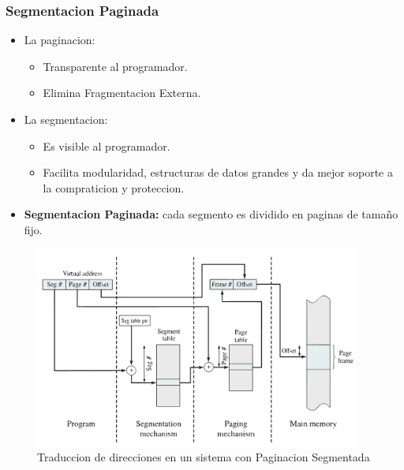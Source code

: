 \subsubsection{Segmentacion Paginada}
\begin{itemize}
    \item La paginacion:
    \begin{itemize}
        \item Transparente al programador.
        \item Elimina Fragmentacion Externa.
    \end{itemize}
    \item La segmentacion:
    \begin{itemize}
        \item Es visible al programador.
        \item Facilita modularidad, estructuras de datos grandes y da mejor soporte a la compraticion y proteccion.
    \end{itemize}
    \item \textbf{Segmentacion Paginada:} cada segmento es dividido en paginas de tamaño fijo.
\end{itemize}
\begin{figure}[h]
    \begin{center}
        \includegraphics[width=0.95\textwidth]{assets/SegmentacionPaginada.pdf}
    \end{center}
    \caption{Traduccion de direcciones en un sistema con Paginacion Segmentada}\label{fig:}
\end{figure}


